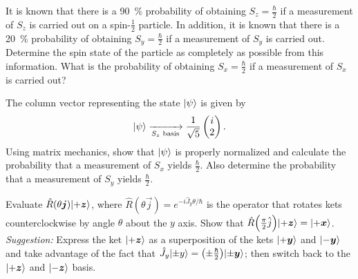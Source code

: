 \documentclass{../phys116}
\begin{document}
\begin{solution}
\end{solution}

\begin{exercise}
  It is known that there is a \SI{90}{\percent} probability of
  obtaining \(S_z = \frac \hbar 2\) if a measurement of \(S_z\) is
  carried out on a spin-\(\frac 1 2\) particle.  In addition, it is
  known that there is a \SI{20}{\percent} probability of obtaining
  \(S_y = \frac \hbar 2\) if a measurement of \(S_y\) is carried out.
  Determine the spin state of the particle as completely as possible
  from this information.  What is the probability of obtaining
  \(S_x = \frac \hbar 2\) if a measurement of \(S_x\) is carried out?
\end{exercise}

\begin{solution}
\end{solution}

\begin{exercise}
  The column vector representing the state \(\lvert\psi\rangle\) is given by
  \[
    \lvert\psi\rangle \xrightarrow[\text{\(S_z\) basis}]{} \frac{1}{\sqrt 5}
    \begin{pmatrix} i \\ 2 \end{pmatrix}.
  \]
  Using matrix mechanics, show that \(\lvert\psi\rangle\) is properly
  normalized and calculate the probability that a measurement of
  \(S_x\) yields \(\frac \hbar 2\).  Also determine the probability
  that a measurement of \(S_y\) yields \(\frac \hbar 2\).
\end{exercise}

\begin{solution}
\end{solution}

\begin{exercise}
  Evaluate \(\hat R(\theta \vec j) \ket{+\vec z}\), where
  \(\hat R(\theta \vec j) = e^{-i \hat J_y \theta/\hbar}\) is the
  operator that rotates kets counterclockwise by angle \(\theta\)
  about the \(y\) axis.  Show that
  \(\hat R\prn*{\frac \pi 2 \hat j} \ket{+\vec z} = \ket{+\vec x}\).
  \textit{Suggestion:} Express the ket \(\ket{+\vec z}\) as a
  superposition of the kets \(\ket{+\vec y}\) and \(\ket{-\vec y}\)
  and take advantage of the fact that
  \(\hat J_y \ket{\pm y} = \prn*{\pm \frac \hbar 2} \ket{\pm \vec
    y}\); then switch back to the \(\ket{+\vec z}\) and
  \(\ket{-\vec z}\) basis.
\end{exercise}

\begin{solution}
\end{solution}
\end{document}

